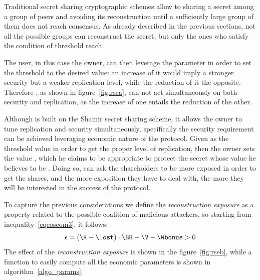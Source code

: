 Traditional secret sharing cryptographic schemes allow to sharing a secret among a group of peers and avoiding its reconstruction until a sufficiently large group of them does not reach consensus. As already described in the previous sections, not all the possible groups can reconstruct the secret, but only the ones who satisfy the condition of threshold reach. 

The user, in this case the owner, can then leverage the parameter \K in order to set the threshold to the desired value: an increase of it would imply a stronger security but a weaker replication level, while the reduction of it the opposite. Therefore \owner, as shown in figure~\ref{fig:rsea}, can not act simultaneously on both security and replication, as the increase of one entails the reduction of the other.

Although \shortname is built on the Shamir secret sharing scheme, it allows the owner to tune replication and security simultaneously, specifically the security requirement can be achieved leveraging economic nature of the protocol. Given \K as the threshold value in order to get the proper level of replication, then the owner sets the value \BH, which he claims to be appropriate to protect the secret whose value he believes to be \V. Doing so, \owner can ask the shareholders to be more exposed in order to get the shares, and the more exposition they have to deal with, the more they will be interested in the success of the protocol. 

To capture the previous considerations we define the {\em reconstruction exposure} as a property related to the possible coalition of malicious attackers, so starting from inequality~\ref{eqcoscom3}, it follows:
\begin{equation}\label{eqtotexp}
\epsilon = (\K - \lost) \cdot \BH - \V - \Wbonus > 0
\end{equation}
The effect of the {\em reconstruction exposure} is shown in the figure~\ref{fig:rseb}, while a function to easily compute all the economic parameters is shown in algorithm~\ref{algo_params}.
